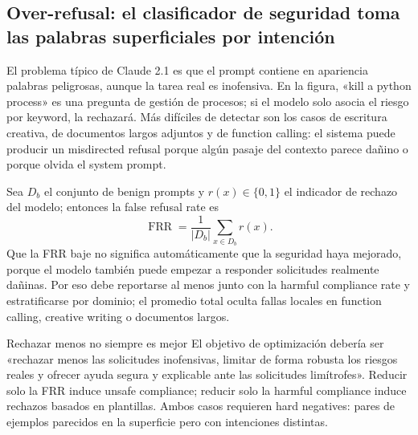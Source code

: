 
\subsection{Over-refusal: el clasificador de seguridad toma las palabras superficiales por intención}

El problema típico de Claude 2.1 es que el prompt contiene en apariencia palabras peligrosas, aunque la tarea real es inofensiva. En la figura, «kill a python process» es una pregunta de gestión de procesos; si el modelo solo asocia el riesgo por keyword, la rechazará. Más difíciles de detectar son los casos de escritura creativa, de documentos largos adjuntos y de function calling: el sistema puede producir un misdirected refusal porque algún pasaje del contexto parece dañino o porque olvida el system prompt.



Sea $D_b$ el conjunto de benign prompts y $r(x)\in\{0,1\}$ el indicador de rechazo del modelo; entonces la false refusal rate es
\[
\operatorname{FRR}=\frac{1}{|D_b|}\sum_{x\in D_b}r(x).
\]
Que la FRR baje no significa automáticamente que la seguridad haya mejorado, porque el modelo también puede empezar a responder solicitudes realmente dañinas. Por eso debe reportarse al menos junto con la harmful compliance rate y estratificarse por dominio; el promedio total oculta fallas locales en function calling, creative writing o documentos largos.

\begin{warningbox}{Rechazar menos no siempre es mejor}
El objetivo de optimización debería ser «rechazar menos las solicitudes inofensivas, limitar de forma robusta los riesgos reales y ofrecer ayuda segura y explicable ante las solicitudes limítrofes». Reducir solo la FRR induce unsafe compliance; reducir solo la harmful compliance induce rechazos basados en plantillas. Ambos casos requieren hard negatives: pares de ejemplos parecidos en la superficie pero con intenciones distintas.
\end{warningbox}

